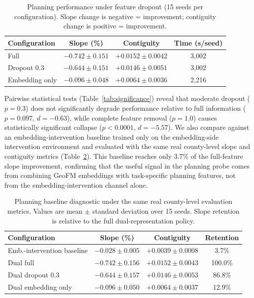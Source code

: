 \documentclass{article}
\begin{document}
\begin{table}[htbp]
\centering
\caption{Planning performance under feature dropout (15 seeds per configuration). Slope change is negative = improvement; contiguity change is positive = improvement.}
\label{tab:dropout}
\footnotesize
\begin{tabular*}{\textwidth}{@{\extracolsep{\fill}}lccc@{}}
\toprule
Configuration & Slope (\%) & Contiguity & Time (s/seed) \\
\midrule
Full & $-0.742 \pm 0.151$ & $+0.0152 \pm 0.0042$ & 3{,}002 \\
Dropout 0.3 & $-0.644 \pm 0.151$ & $+0.0146 \pm 0.0051$ & 3{,}002 \\
Embedding only & $-0.096 \pm 0.048$ & $+0.0064 \pm 0.0036$ & 2{,}216 \\
\bottomrule
\end{tabular*}
\end{table}

Pairwise statistical tests (Table~\ref{tab:significance}) reveal that moderate dropout ($p=0.3$) does not significantly degrade performance relative to full information ($p = 0.097$, $d = -0.63$), while complete feature removal ($p=1.0$) causes statistically significant collapse ($p < 0.0001$, $d = -5.57$). We also compare against an embedding-intervention baseline trained only on the embedding-side intervention environment and evaluated with the same real county-level slope and contiguity metrics (Table~\ref{tab:planning_baseline}). This baseline reaches only 3.7\% of the full-feature slope improvement, confirming that the useful signal in the planning probe comes from combining GeoFM embeddings with task-specific planning features, not from the embedding-intervention channel alone.

\begin{table}[htbp]
\centering
\caption{Planning baseline diagnostic under the same real county-level evaluation metrics. Values are mean $\pm$ standard deviation over 15 seeds. Slope retention is relative to the full dual-representation policy.}
\label{tab:planning_baseline}
\footnotesize
\begin{tabular}{lccc}
\toprule
Configuration & Slope (\%) & Contiguity & Retention \\
\midrule
Emb.-intervention baseline & $-0.028 \pm 0.005$ & $+0.0039 \pm 0.0008$ & 3.7\% \\
Dual full & $-0.742 \pm 0.156$ & $+0.0152 \pm 0.0043$ & 100.0\% \\
Dual dropout 0.3 & $-0.644 \pm 0.157$ & $+0.0146 \pm 0.0053$ & 86.8\% \\
Dual embedding only & $-0.096 \pm 0.050$ & $+0.0064 \pm 0.0037$ & 12.9\% \\
\bottomrule
\end{tabular}
\end{table}
\end{document}
